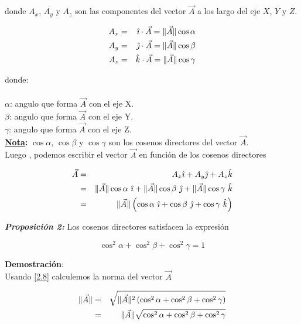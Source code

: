 \documentclass[12pt]{report}
\DeclarePairedDelimiter\norm{\lVert}{\rVert}
\begin{document}
donde $A_x$, $A_y$ y $A_z$ son las componentes del vector $\vec{A}$  a los largo del eje $X$, $Y$ y $Z$.

\begin{eqnarray} \nonumber
A_x &=& \hat{\imath} \cdot \vec{A} = \norm{\vec{A}} \cos \alpha \\ \nonumber
A_y &=& \hat{\jmath} \cdot \vec{A} = \norm{\vec{A}} \cos \beta \\  \nonumber
A_z &=& \hat{k} \cdot \vec{A} = \norm{\vec{A}} \cos \gamma 
\end{eqnarray}

donde: \\
\\
$\alpha$: angulo que forma $\vec{A}$ con el eje X.\\
$\beta$: angulo que forma $\vec{A}$ con el eje Y. \\
$\gamma$: angulo que forma $\vec{A}$ con el eje Z.
 \\

 \textbf{\underline{Nota}:} $\cos \alpha$, $\cos \beta$ y $\cos \gamma$ son los cosenos directores del vector $\vec{A}$. \\
 

Luego , podemos escribir el vector $\vec{A}$ en función de los cosenos directores

\begin{eqnarray} \nonumber
\vec{A}&=&A_x \hat{\imath} + A_y \hat{\jmath} + A_z \hat{k} \\ \nonumber
&=& \norm{\vec{A}} \cos\alpha \ \hat{\imath} + \norm{\vec{A}} \cos \beta \ \hat{\jmath} + \norm{\vec{A}} \cos \gamma \ \hat{k} \\ 
&=& \norm{\vec{A}} \left( \cos\alpha \ \hat{\imath} + \cos \beta \ \hat{\jmath} + \cos \gamma \ \hat{k} \right) \label{2.8}
\end{eqnarray}

\textbf{\textit{Proposición 2:}} Los cosenos directores satisfacen la expresión

\begin{equation}\label{2.9}
\cos^2 \alpha + \cos^2 \beta + \cos^2 \gamma = 1
\end{equation}

\textbf{Demostración}: \\

Usando \eqref{2.8} calculemos la norma del vector $\vec{A}$ 

\begin{eqnarray} \nonumber
\norm{\vec{A}} &=&\sqrt{\norm{\vec{A}}^2 \left( \cos^2 \alpha + \cos^2 \beta + \cos^2 \gamma \right)} \\ \nonumber
&=& \norm{\vec{A}} \sqrt{\cos^2 \alpha + \cos^2 \beta + \cos^2 \gamma}
\end{eqnarray} 
\end{document}
